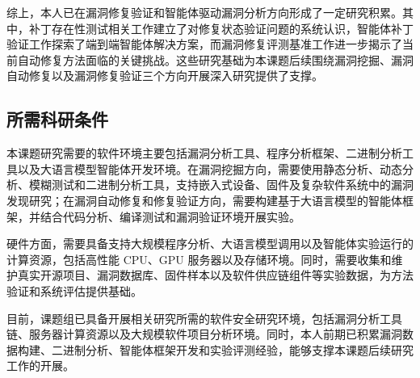 综上，本人已在漏洞修复验证和智能体驱动漏洞分析方向形成了一定研究积累。其中，补丁存在性测试相关工作建立了对修复状态验证问题的系统认识，智能体补丁验证工作探索了端到端智能体解决方案，而漏洞修复评测基准工作进一步揭示了当前自动修复方法面临的关键挑战。这些研究基础为本课题后续围绕漏洞挖掘、漏洞自动修复以及漏洞修复验证三个方向开展深入研究提供了支撑。

\subsection{所需科研条件}

本课题研究需要的软件环境主要包括漏洞分析工具、程序分析框架、二进制分析工具以及大语言模型智能体开发环境。在漏洞挖掘方向，需要使用静态分析、动态分析、模糊测试和二进制分析工具，支持嵌入式设备、固件及复杂软件系统中的漏洞发现研究；在漏洞自动修复和修复验证方向，需要构建基于大语言模型的智能体框架，并结合代码分析、编译测试和漏洞验证环境开展实验。

硬件方面，需要具备支持大规模程序分析、大语言模型调用以及智能体实验运行的计算资源，包括高性能 CPU、GPU 服务器以及存储环境。同时，需要收集和维护真实开源项目、漏洞数据库、固件样本以及软件供应链组件等实验数据，为方法验证和系统评估提供基础。

目前，课题组已具备开展相关研究所需的软件安全研究环境，包括漏洞分析工具链、服务器计算资源以及大规模软件项目分析环境。同时，本人前期已积累漏洞数据构建、二进制分析、智能体框架开发和实验评测经验，能够支撑本课题后续研究工作的开展。
